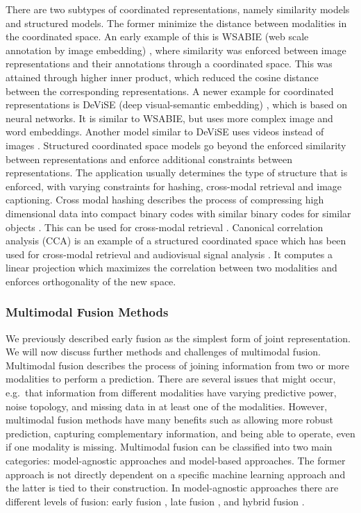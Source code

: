 \documentclass{article}
\begin{document}
There are two subtypes of coordinated representations, namely similarity models and structured models. The former minimize the distance between modalities in the coordinated space. An early example of this is WSABIE (web scale annotation by image embedding) \citep{weston2011wsabie}, where similarity was enforced between image representations and their annotations through a coordinated space. This was attained through higher inner product, which reduced the cosine distance between the corresponding representations. A newer example for coordinated representations is DeViSE (deep visual-semantic embedding) \citep{frome2013devise}, which is based on neural networks. It is similar to WSABIE, but uses more complex image and word embeddings. Another model similar to DeViSE uses videos instead of images \citep{pan2016joint}.
Structured coordinated space models go beyond the enforced similarity between representations and enforce additional constraints between representations. The application usually determines the type of structure that is enforced, with varying constraints for hashing, cross-modal retrieval and image captioning. Cross modal hashing describes the process of compressing high dimensional data into compact binary codes with similar binary codes for similar objects \citep{wang2014hashing}. This can be used for cross-modal retrieval \citep{bronstein2010data, jiang2015class}. Canonical correlation analysis (CCA) \citep{hotelling1936relations} is an example of a structured coordinated space which has been used for cross-modal retrieval \citep{hardoon2004canonical, klein2015associating, Rasiwasia2010ANA} and audiovisual signal analysis \citep{sargin2007audio, slaney2001facesync}. It computes a linear projection which maximizes the correlation between two modalities and enforces orthogonality of the new space.

\subsubsection{Multimodal Fusion Methods}

We previously described early fusion as the simplest form of joint representation. We will now discuss further methods and challenges of multimodal fusion. Multimodal fusion describes the process of joining information from two or more modalities to perform a prediction. There are several issues that might occur, e.g.\ that information from different modalities have varying predictive power, noise topology, and missing data in at least one of the modalities. However, multimodal fusion methods have many benefits such as allowing more robust prediction, capturing complementary information, and being able to operate, even if one modality is missing. Multimodal fusion can be classified into two main categories: model-agnostic approaches and model-based approaches. The former approach is not directly dependent on a specific machine learning approach and the latter is tied to their construction. In model-agnostic approaches there are different levels of fusion: early fusion \citep{leong2011going, bruni2011distri}, late fusion \citep{gunes2005affect, snoek2005late}, and hybrid fusion \citep{atrey2010hybrid}.
\end{document}
